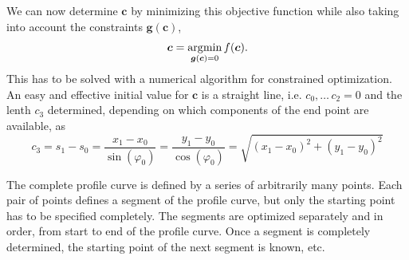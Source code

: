 %
We can now determine $\boldsymbol{c}$ by minimizing this objective function while also taking into account the constraints $\boldsymbol{g}(\boldsymbol{c})$,
%
\begin{equation}
\boldsymbol{c} = \operatorname*{\arg\!\min}_{\boldsymbol{g}(\boldsymbol{c}) = 0} f(\boldsymbol{c}).
\end{equation}
%
This has to be solved with a numerical algorithm for constrained optimization.
An easy and effective initial value for $\boldsymbol{c}$ is a straight line, i.e. $c_0,\ldots\,c_2 = 0$ and the lenth $c_3$ determined, depending on which components of the end point are available, as
%
\begin{equation}
c_3 = s_1 - s_0 = \frac{x_1 - x_0}{\sin(\varphi_0)} = \frac{y_1 - y_0}{\cos(\varphi_0)} = \sqrt{(x_1 - x_0)^2 + (y_1 - y_0)^2}
\end{equation}
%

The complete profile curve is defined by a series of arbitrarily many points.
Each pair of points defines a segment of the profile curve, but only the starting point has to be specified completely.
The segments are optimized separately and in order, from start to end of the profile curve.
Once a segment is completely determined, the starting point of the next segment is known, etc.